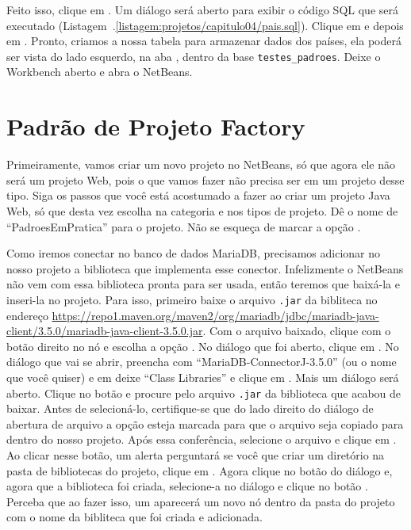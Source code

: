 Feito isso, clique em . Um diálogo será aberto para exibir o código SQL que será executado (Listagem~\thechapter.\ref{listagem:projetos/capitulo04/pais.sql}). Clique em  e depois em . Pronto, criamos a nossa tabela para armazenar dados dos países, ela poderá ser vista do lado esquerdo, na aba , dentro da base \texttt{testes\_padroes}. Deixe o Workbench aberto e abra o NetBeans. 


\section{Padrão de Projeto Factory}

Primeiramente, vamos criar um novo projeto no NetBeans, só que agora ele não será um projeto Web, pois o que vamos fazer não precisa ser em um projeto desse tipo. Siga os passos que você está acostumado a fazer ao criar um projeto Java Web, só que desta vez escolha  na categoria e  nos tipos de projeto. Dê o nome de ``PadroesEmPratica'' para o projeto. Não se esqueça de marcar a opção .

Como iremos conectar no banco de dados MariaDB, precisamos adicionar no nosso projeto a biblioteca que implementa esse conector. Infelizmente o NetBeans não vem com essa biblioteca pronta para ser usada, então teremos que baixá-la e inseri-la no projeto. Para isso, primeiro baixe o arquivo \texttt{.jar} da bibliteca no endereço \url{https://repo1.maven.org/maven2/org/mariadb/jdbc/mariadb-java-client/3.5.0/mariadb-java-client-3.5.0.jar}. Com o arquivo baixado, clique com o botão direito no nó  e escolha a opção . No diálogo que foi aberto, clique em . No diálogo que vai se abrir, preencha  com ``MariaDB-ConnectorJ-3.5.0'' (ou o nome que você quiser) e em  deixe ``Class Libraries'' e clique em . Mais um diálogo será aberto. Clique no botão  e procure pelo arquivo \texttt{.jar} da biblioteca que acabou de baixar. Antes de selecioná-lo, certifique-se que do lado direito do diálogo de abertura de arquivo a opção  esteja marcada para que o arquivo seja copiado para dentro do nosso projeto. Após essa conferência, selecione o arquivo e clique em . Ao clicar nesse botão, um alerta perguntará se você que criar um diretório na pasta de bibliotecas do projeto, clique em . Agora clique no botão  do diálogo  e, agora que a biblioteca foi criada, selecione-a no diálogo  e clique no botão . Perceba que ao fazer isso, um aparecerá um novo nó dentro da pasta  do projeto com o nome da bibliteca que foi criada e adicionada.

